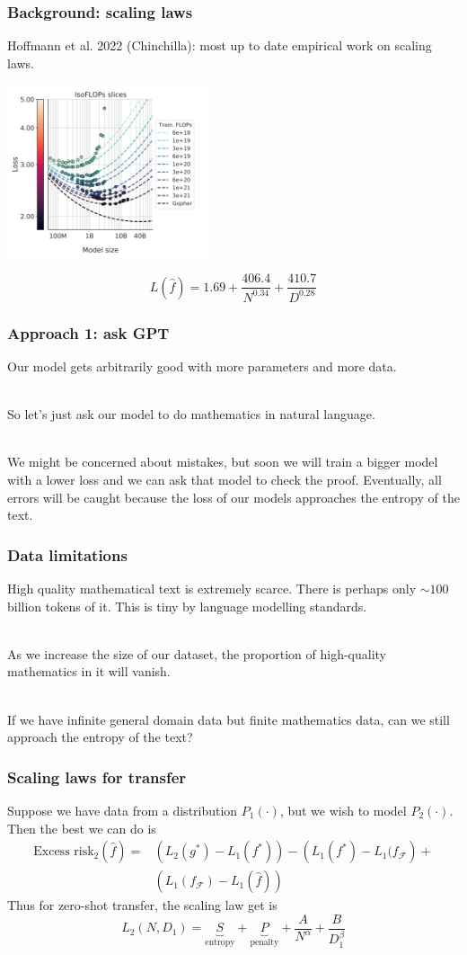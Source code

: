 \documentclass{beamer}
\begin{document}
\begin{frame}
\frametitle{Background: scaling laws}
Hoffmann et al. 2022 (Chinchilla): most up to date empirical work on scaling laws. 
\begin{center}
    \includegraphics[width=0.45\textwidth]{img/chinchilla.png} 
\end{center}
$$L(\hat{f}) = 1.69 + \frac{406.4}{N^{0.34}} + \frac{410.7}{D^{0.28}}$$
\end{frame}

\begin{frame}
\frametitle{Approach 1: ask GPT}
Our model gets arbitrarily good with more parameters and more data.\\~\

So let's just ask our model to do mathematics in natural language. \\~\

\pause
We might be concerned about mistakes, but soon we will train a bigger model with a lower loss and we can ask that model to check the proof. Eventually, all errors will be caught because the loss of our models approaches the entropy of the text.
\end{frame}

\begin{frame}
\frametitle{Data limitations}
High quality mathematical text is extremely scarce. There is perhaps only $\sim 100$ billion tokens of it. This is tiny by language modelling standards.\\~\

As we increase the size of our dataset, the proportion of high-quality mathematics in it will vanish.\\~\

If we have infinite general domain data but finite mathematics data, can we still approach the entropy of the text?
\end{frame}

\begin{frame}
\frametitle{Scaling laws for transfer}
Suppose we have data from a distribution $P_1(\cdot)$, but we wish to model $P_2(\cdot)$. Then the best we can do is 
\begin{align*}
    \text{Excess risk}_2(\hat{f}) = &\left(L_2(g^*) - L_1(f^*)\right) - \left(L_1(f^*)-L_1(f_{\mathcal{F}}\right) + \\ & \left(L_1(f_{\mathcal{F}}) - L_1(\hat{f})\right)
\end{align*}
\pause
Thus for zero-shot transfer, the scaling law get is 
$$L_2(N, D_1) = \underbrace{S}_{\text{entropy}} + \underbrace{P}_{\text{penalty}} + \frac{A}{N^\alpha} + \frac{B}{D_1^\beta}$$
\end{frame}
\end{document}
